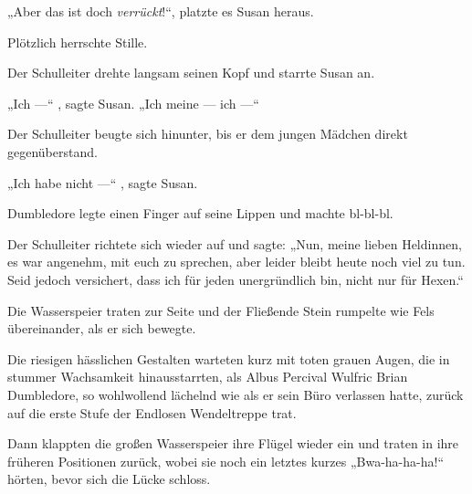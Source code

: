 „Aber das ist doch \emph{verrückt}!“, platzte es Susan heraus.

Plötzlich herrschte Stille.

Der Schulleiter drehte langsam seinen Kopf und starrte Susan an.

„Ich —“ , sagte Susan.
„Ich meine — ich —“

Der Schulleiter beugte sich hinunter, bis er dem jungen Mädchen direkt gegenüberstand.

„Ich habe nicht —“ , sagte Susan.

Dumbledore legte einen Finger auf seine Lippen und machte bl-bl-bl.

Der Schulleiter richtete sich wieder auf und sagte:
„Nun, meine lieben Heldinnen, es war angenehm, mit euch zu sprechen, aber leider bleibt heute noch viel zu tun. Seid jedoch versichert, dass ich für jeden unergründlich bin, nicht nur für Hexen.“

Die Wasserspeier traten zur Seite und der Fließende Stein rumpelte wie Fels übereinander, als er sich bewegte.

Die riesigen hässlichen Gestalten warteten kurz mit toten grauen Augen, die in stummer Wachsamkeit hinausstarrten, als Albus Percival Wulfric Brian Dumbledore, so wohlwollend lächelnd wie als er sein Büro verlassen hatte, zurück auf die erste Stufe der Endlosen Wendeltreppe trat.

Dann klappten die großen Wasserspeier ihre Flügel wieder ein und traten in ihre früheren Positionen zurück, wobei sie noch ein letztes kurzes
„Bwa-ha-ha-ha!“ hörten, bevor sich die Lücke schloss.

